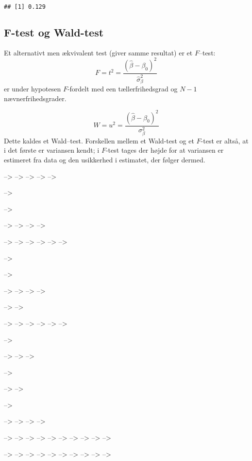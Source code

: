 \documentclass[]{article}
\begin{document}
\begin{verbatim}
## [1] 0.129
\end{verbatim}

\normalsize

\subsection{F-test og Wald-test}\label{f-test-og-wald-test}

Et alternativt men ækvivalent test (giver samme resultat) er et
\(F\)--test: \[
F = t^2 =\frac{(\hat\beta-\beta_0)^2}{\hat\sigma^2_\beta}
\] er under hypotesen \(F\)-fordelt med een tællerfrihedsgrad og \(N-1\)
nævnerfrihedsgrader.

\[
  W = u^2 =\frac{(\hat\beta-\beta_0)^2}{\sigma^2_\beta}
\] Dette kaldes et Wald--test. Forskellen mellem et Wald-test og et
\(F\)-test er altså, at i det første er variansen kendt; i \(F\)-test
tages der højde for at variansen er estimeret fra data og den usikkerhed
i estimatet, der følger dermed.

--\textgreater{} --\textgreater{} --\textgreater{} --\textgreater{}
--\textgreater{}

--\textgreater{}

--\textgreater{}

--\textgreater{} --\textgreater{} --\textgreater{} --\textgreater{}

--\textgreater{} --\textgreater{} --\textgreater{} --\textgreater{}
--\textgreater{} --\textgreater{}

--\textgreater{}

--\textgreater{}

--\textgreater{} --\textgreater{} --\textgreater{} --\textgreater{}

--\textgreater{} --\textgreater{}

--\textgreater{} --\textgreater{} --\textgreater{} --\textgreater{}
--\textgreater{} --\textgreater{}

--\textgreater{}

--\textgreater{} --\textgreater{} --\textgreater{}

--\textgreater{}

--\textgreater{} --\textgreater{}

--\textgreater{}

--\textgreater{} --\textgreater{} --\textgreater{} --\textgreater{}

--\textgreater{} --\textgreater{} --\textgreater{} --\textgreater{}
--\textgreater{} --\textgreater{} --\textgreater{} --\textgreater{}
--\textgreater{} --\textgreater{}

--\textgreater{} --\textgreater{} --\textgreater{} --\textgreater{}
--\textgreater{} --\textgreater{} --\textgreater{} --\textgreater{}
--\textgreater{} --\textgreater{}
\end{document}
